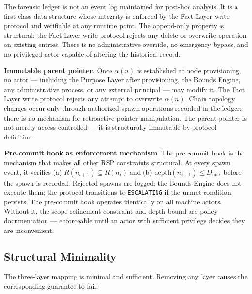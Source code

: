 The forensic ledger is not an event log maintained for post-hoc analysis. It is a first-class data structure whose integrity is enforced by the Fact Layer write protocol and verifiable at any runtime point. The append-only property is structural: the Fact Layer write protocol rejects any delete or overwrite operation on existing entries. There is no administrative override, no emergency bypass, and no privileged actor capable of altering the historical record.

\medskip
\noindent\textbf{Immutable parent pointer.} Once $\alpha(n)$ is established at node provisioning, no actor — including the Purpose Layer after provisioning, the Bounds Engine, any administrative process, or any external principal — may modify it. The Fact Layer write protocol rejects any attempt to overwrite $\alpha(n)$. Chain topology changes occur only through authorized spawn operations recorded in the ledger; there is no mechanism for retroactive pointer manipulation. The parent pointer is not merely access-controlled — it is structurally immutable by protocol definition.

\medskip
\noindent\textbf{Pre-commit hook as enforcement mechanism.} The pre-commit hook is the mechanism that makes all other RSP constraints structural. At every spawn event, it verifies (a) $R(n_{i+1}) \subseteq R(n_i)$ and (b) $\mathrm{depth}(n_{i+1}) \leq D_{\mathrm{max}}$ before the spawn is recorded. Rejected spawns are logged; the Bounds Engine does not execute them; the protocol transitions to \texttt{ESCALATING} if the unmet condition persists. The pre-commit hook operates identically on all machine actors. Without it, the scope refinement constraint and depth bound are policy documentation — enforceable until an actor with sufficient privilege decides they are inconvenient.

\subsection{Structural Minimality}
\label{sec:rs-minimality}

The three-layer mapping is minimal and sufficient. Removing any layer causes the corresponding guarantee to fail:

